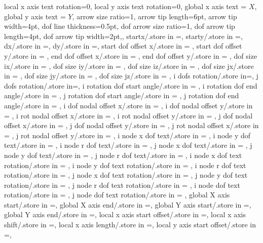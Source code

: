 {{local x axis text rotation=0,
local y axis text rotation=0,
global x axis text = $X$,
global y axis text = $Y$,
arrow size ratio=1,
arrow tip length=6pt,
arrow tip width=4pt,
dof line thickness=0.5pt,
dof arrow size ratio=1,
dof arrow tip length=4pt,
dof arrow tip width=2pt,},
startx/.store in =\startx,
starty/.store in =\starty,
dx/.store in =\deltaxdir,
dy/.store in =\deltaydir,
start dof offset x/.store in = \startoffsetx,
start dof offset y/.store in = \startoffsety,
end dof offset x/.store in = \endoffsetx,
end dof offset y/.store in = \endoffsety,
dof size ix/.store in = \lengthdofsix,
dof size iy/.store in = \lengthdofsiy,
dof size iz/.store in = \lengthdofsiz,
dof size jx/.store in = \lengthdofsjx,
dof size jy/.store in = \lengthdofsjy,
dof size jz/.store in = \lengthdofsjz,
i dofs rotation/.store in=\dofsroti,
j dofs rotation/.store in=\dofsrotj,
i rotation dof start angle/.store in = \irotdofstartangle,
i rotation dof end angle/.store in = \irotdofendangle,
j rotation dof start angle/.store in = \jrotdofstartangle,
j rotation dof end angle/.store in = \jrotdofendangle, 
i dof nodal offset x/.store in = \idofnodaloffsetx,
i dof nodal offset y/.store in = \idofnodaloffsety,
i rot nodal offset x/.store in = \irotnodaloffsetx,
i rot nodal offset y/.store in = \irotnodaloffsety,
j dof nodal offset x/.store in = \jdofnodaloffsetx,
j dof nodal offset y/.store in = \jdofnodaloffsety,
j rot nodal offset x/.store in = \jrotnodaloffsetx,
j rot nodal offset y/.store in = \jrotnodaloffsety,
i node x dof text/.store in = \inodexdoftext,
i node y dof text/.store in = \inodeydoftext,
i node r dof text/.store in = \inoderdoftext,
j node x dof text/.store in = \jnodexdoftext,
j node y dof text/.store in = \jnodeydoftext,
j node r dof text/.store in = \jnoderdoftext,
i node x dof text rotation/.store in = \inodexdoftextrot,
i node y dof text rotation/.store in = \inodeydoftextrot,
i node r dof text rotation/.store in = \inoderdoftextrot,
j node x dof text rotation/.store in = \jnodexdoftextrot,
j node y dof text rotation/.store in = \jnodeydoftextrot,
j node r dof text rotation/.store in = \jnoderdoftextrot,
i node dof text rotation/.store in = \inodedoftextrot,
j node dof text rotation/.store in = \jnodedoftextrot,
global X axis start/.store in =\globalXstart,
global X axis end/.store in =\globalXend,
global Y axis start/.store in =\globalYstart,
global Y axis end/.store in =\globalYend,
local x axis start offset/.store in =\localxstartoffset,
local x axis shift/.store in =\localxshift,
local x axis length/.store in =\localxlength,
local y axis start offset/.store in =\localystartoffset,
}
